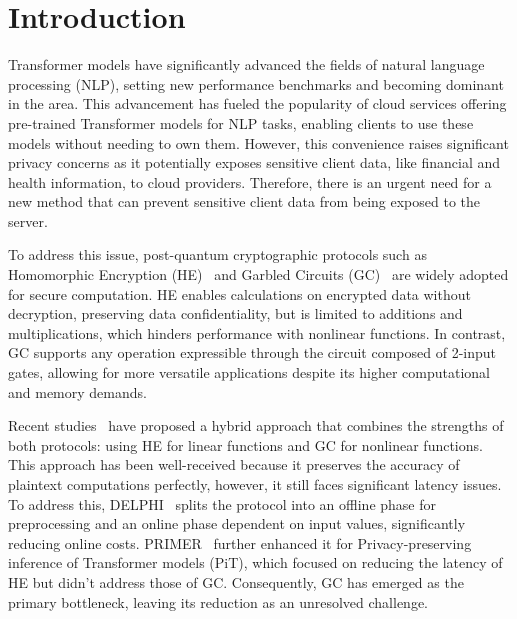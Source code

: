 \section{Introduction}

Transformer models have significantly advanced the fields of natural language processing (NLP), setting new performance benchmarks and becoming dominant in the area. This advancement has fueled the popularity of cloud services offering pre-trained Transformer models for NLP tasks, enabling clients to use these models without needing to own them. However, this convenience raises significant privacy concerns as it potentially exposes sensitive client data, like financial and health information, to cloud providers. Therefore, there is an urgent need for a new method that can prevent sensitive client data from being exposed to the server.

To address this issue, post-quantum cryptographic protocols such as Homomorphic Encryption (HE)~\cite{gentry2009fully, brakerski2014leveled} and Garbled Circuits (GC)~\cite{bellare2013efficient} are widely adopted for secure computation. HE enables calculations on encrypted data without decryption, preserving data confidentiality, but is limited to additions and multiplications, which hinders performance with nonlinear functions. In contrast, GC supports any operation expressible through the circuit composed of 2-input gates, allowing for more versatile applications despite its higher computational and memory demands.

Recent studies~\cite{juvekar2018gazelle, mishra2020delphi, garimella2023characterizing, zheng2023primer} have proposed a hybrid approach that combines the strengths of both protocols: using HE for linear functions and GC for nonlinear functions. This approach has been well-received because it preserves the accuracy of plaintext computations perfectly, however, it still faces significant latency issues.
To address this, DELPHI~\cite{mishra2020delphi} splits the protocol into an offline phase for preprocessing and an online phase dependent on input values, significantly reducing online costs.
PRIMER~\cite{zheng2023primer} further enhanced it for Privacy-preserving inference of Transformer models (PiT), which focused on reducing the latency of HE but didn't address those of GC. Consequently, GC has emerged as the primary bottleneck, leaving its reduction as an unresolved challenge.

